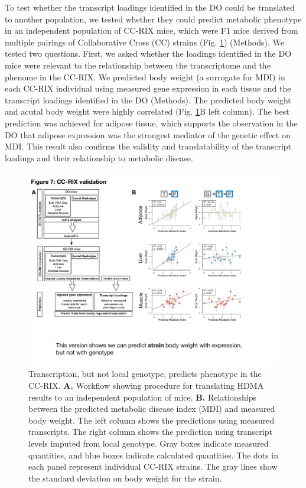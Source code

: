 \documentclass[
]{article}
\begin{document}
To test whether the transcript loadings identified in the DO could be
translated to another population, we tested whether they could predict
metabolic phenotype in an independent population of CC-RIX mice, which
were F1 mice derived from multiple pairings of Collaborative Cross (CC)
\cite{pmid28592495, pmid21411855, 
pmid17674098, pmid15514660} strains (Fig. \ref{fig:cc_prediction})
(Methods). We tested two questions. First, we asked whether the loadings
identified in the DO mice were relevant to the relationship between the
transcriptome and the phenome in the CC-RIX. We predicted body weight (a
surrogate for MDI) in each CC-RIX individual using measured gene
expression in each tissue and the transcript loadings identified in the
DO (Methods). The predicted body weight and acutal body weight were
highly correlated (Fig. \ref{fig:cc_prediction}B left column). The best
prediction was achieved for adipose tissue, which supports the
observation in the DO that adipose expression was the strongest mediator
of the genetic effect on MDI. This result also confirms the validity and
translatability of the transcript loadings and their relationship to
metabolic disease.

\begin{figure}[ht!]
\includegraphics[width=\textwidth]{Figures/Fig7_CC_Prediction.pdf} 
\caption{Transcription, but not local genotype, predicts 
phenotype in the CC-RIX. \textbf{A.} Workflow showing procedure 
for translating HDMA results to an independent population of mice. 
\textbf{B.} Relationships between the predicted metabolic disease
index (MDI) and measured body weight. The left column shows the 
predictions using measured transcripts. The right column shows 
the prediction using transcript levels imputed from local genotype. 
Gray boxes indicate measured quantities, and blue boxes indicate 
calculated quantities. The dots in each panel represent individual 
CC-RIX strains. The gray lines show the standard deviation on body 
weight for the strain.
}
\label{fig:cc_prediction}
\end{figure}
\end{document}
